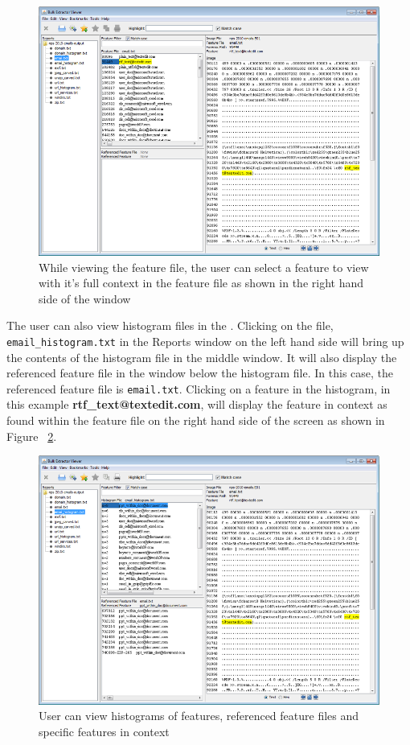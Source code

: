 \documentclass[11pt]{article} %
\begin{document}
\begin{figure}
	\includegraphics[scale=.7]{viewerPics/emailFeatureFile.png}
	\caption{While viewing the feature file, the user can select a feature to view with it's full context in the feature file as shown in the right hand side of the window}
	\label{fig:emailFeatureFile}
\end{figure}

The user can also view histogram files in the \viewer. Clicking on the file, \texttt{email\_histogram.txt} in the Reports window on the left hand side will bring up the contents of the histogram file in the middle window. It will also display the referenced feature file in the window below the histogram file. In this case, the referenced feature file is \texttt{email.txt}. Clicking on a feature in the histogram, in this example \textbf{rtf\_text@textedit.com}, will display the feature in context as found within the feature file on the right hand side of the screen as shown in Figure ~\ref{fig:emailHistogramView}.\\

\begin{figure}
	\includegraphics[scale=.70]{viewerPics/emailHistogramView.png}
	\caption{User can view histograms of features, referenced feature files and specific features in context}
	\label{fig:emailHistogramView}
\end{figure}
\end{document}

